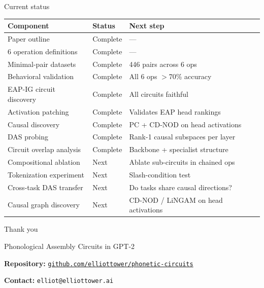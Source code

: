 \documentclass[10pt,aspectratio=169]{beamer}
\begin{document}
\begin{frame}{Current status}

\begin{center}
\small
\begin{tabular}{lll}
\toprule
\textbf{Component} & \textbf{Status} & \textbf{Next step} \\
\midrule
Paper outline & \textcolor{circuit}{Complete} & --- \\
6 operation definitions & \textcolor{circuit}{Complete} & --- \\
Minimal-pair datasets & \textcolor{circuit}{Complete} & 446 pairs across 6 ops \\
Behavioral validation & \textcolor{circuit}{Complete} & All 6 ops $>$70\% accuracy \\
EAP-IG circuit discovery & \textcolor{circuit}{Complete} & All circuits faithful \\
\midrule
Activation patching & \textcolor{circuit}{Complete} & Validates EAP head rankings \\
Causal discovery & \textcolor{circuit}{Complete} & PC + CD-NOD on head activations \\
DAS probing & \textcolor{circuit}{Complete} & Rank-1 causal subspaces per layer \\
Circuit overlap analysis & \textcolor{circuit}{Complete} & Backbone + specialist structure \\
\midrule
Compositional ablation & \textcolor{backbone}{Next} & Ablate sub-circuits in chained ops \\
Tokenization experiment & \textcolor{backbone}{Next} & Slash-condition test \\
Cross-task DAS transfer & \textcolor{backbone}{Next} & Do tasks share causal directions? \\
Causal graph discovery & \textcolor{backbone}{Next} & CD-NOD / LiNGAM on head activations \\
\bottomrule
\end{tabular}
\end{center}

\end{frame}

\begin{frame}{Thank you}

\begin{center}
\vfill
{\Large Phonological Assembly Circuits in GPT-2}

\vspace{1.5em}

\textbf{Repository:} \href{https://github.com/elliottower/phonetic-circuits}{\texttt{github.com/elliottower/phonetic-circuits}}

\textbf{Contact:} \texttt{elliot@elliottower.ai}

\vspace{1.5em}

\vfill
\end{center}
\end{frame}
\end{document}
